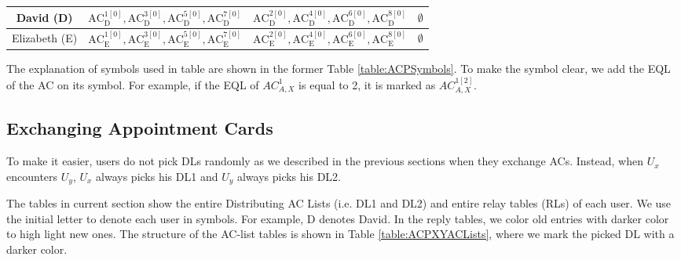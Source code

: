 \begin{table} [hbtp]
\begin{tabu}{|c|l|l|l|}
David (D) & ${\mathrm{AC}}^{\mathrm{1}\left[0\right]}_{\mathrm{D}},{\mathrm{AC}}^{\mathrm{3}\left[0\right]}_{\mathrm{D}},{\mathrm{AC}}^{\mathrm{5}\left[0\right]}_{\mathrm{D}},{\mathrm{AC}}^{\mathrm{7}\left[0\right]}_{\mathrm{D}}$ & ${\mathrm{AC}}^{\mathrm{2}\left[0\right]}_{\mathrm{D}},{\mathrm{AC}}^{\mathrm{4}\left[0\right]}_{\mathrm{D}},{\mathrm{AC}}^{\mathrm{6}\left[0\right]}_{\mathrm{D}},{\mathrm{AC}}^{\mathrm{8}\left[0\right]}_{\mathrm{D}}$ & $\mathrm{\emptyset }$ \\ \hline 
Elizabeth (E) & ${\mathrm{AC}}^{\mathrm{1}\left[0\right]}_{\mathrm{E}},{\mathrm{AC}}^{\mathrm{3}\left[0\right]}_{\mathrm{E}},{\mathrm{AC}}^{\mathrm{5}\left[0\right]}_{\mathrm{E}},{\mathrm{AC}}^{\mathrm{7}\left[0\right]}_{\mathrm{E}}$ & ${\mathrm{AC}}^{\mathrm{2}\left[0\right]}_{\mathrm{E}},{\mathrm{AC}}^{\mathrm{4}\left[0\right]}_{\mathrm{E}},{\mathrm{AC}}^{\mathrm{6}\left[0\right]}_{\mathrm{E}},{\mathrm{AC}}^{\mathrm{8}\left[0\right]}_{\mathrm{E}}$ & $\mathrm{\emptyset }$ \\ \hline 
\end{tabu}
\end{table}

The explanation of symbols used in table are shown in the former Table \ref{table:ACPSymbols}. To make the symbol clear, we add the EQL of the AC on its symbol. For example, if the EQL of ${AC}^1_{A,X}$ is equal to 2, it is marked as ${AC}^{1\left[2\right]}_{A,X}$.


\subsection{ Exchanging Appointment Cards}

\noindent To make it easier, users do not pick DLs randomly as we described in the previous sections when they exchange ACs. Instead, when $U_x$ encounters $U_y$, $U_x$ always picks his DL1 and $U_y$ always picks his DL2. 

\noindent The tables in current section show the entire Distributing AC Lists (i.e. DL1 and DL2) and entire relay tables (RLs) of each user. We use the initial letter to denote each user in symbols. For example, D denotes David. In the reply tables, we color old entries with darker color to high light new ones. The structure of the AC-list tables is shown in Table \ref{table:ACPXYACLists}, where we mark the picked DL with a darker color.

